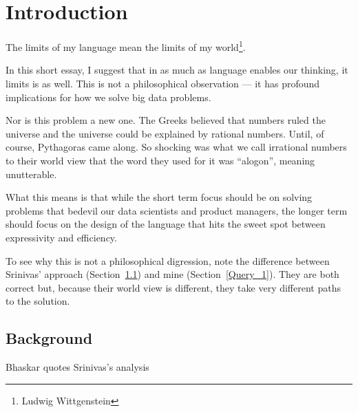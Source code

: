 % 
\usepackage{hyperref}

\section{Introduction}

\begin{center}
The limits of my language mean the limits of my world\footnote{Ludwig
  Wittgenstein}.
\end{center}

In this short essay, I suggest that in as much as language enables our
thinking, it limits is as well. This is not a philosophical observation
--- it has profound implications for how we solve big data problems. 

Nor is this problem a new one. The Greeks believed that numbers ruled
the universe and the universe could be explained by rational numbers.
Until, of course, Pythagoras came along. So shocking was what we call
irrational numbers to their world view that the word they used for it
was ``alogon'', meaning unutterable. 

What this means is that while the short term focus should be on solving
problems that bedevil our data scientists and product managers, the
longer term should focus on the design of the language that hits the
sweet spot between expressivity and efficiency. 

To see why this is not a philosophical digression, note 
the difference between Srinivas' approach (Section~\ref{Background}) and
    mine (Section~\ref{Query_1}). They are both
correct but, because their world view is different, they take very
different paths to the solution.

\begin{figure}
\end{figure}

\newpage


\subsection{Background}
\label{Background}
Bhaskar quotes Srinivas's analysis

